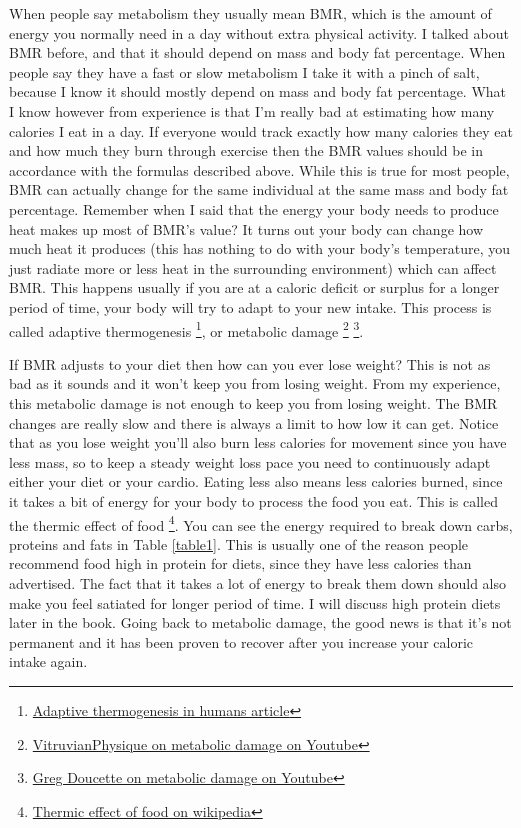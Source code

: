 \documentclass[openany, 12pt]{book}
\begin{document}
	When people say metabolism they usually mean BMR, which is the amount of energy you normally need in a day without extra physical activity. I talked about BMR before, and 
	that it should depend on mass and body fat percentage. When people say they have a fast or slow metabolism I take it with a pinch of salt, because I know it should mostly depend
        on mass and body fat percentage. What I know however from experience is that I'm really bad at estimating how many calories I eat in a day. If everyone would track exactly how
        many calories they eat and how much they burn through exercise then the BMR values should be in accordance with the formulas described above. While this is true for most people,
        BMR can actually change for the same individual at the same mass and body fat percentage. Remember when I said that the energy your body needs to produce heat makes up most of
        BMR's value? It turns out your body can change how much heat it produces (this has nothing to do with your body's temperature, you just radiate more or less heat in the surrounding
        environment) which can affect BMR. This happens usually if you are at a caloric deficit or surplus for a longer period of time, your body will try to adapt to your new intake. This
        process is called adaptive thermogenesis
        \footnote{\href{https://www.ncbi.nlm.nih.gov/pmc/articles/PMC3673773/}{Adaptive thermogenesis in humans article}}, or metabolic damage
        \footnote{\href{https://www.youtube.com/watch?v=bLboowVr2DM}{VitruvianPhysique on metabolic damage on Youtube}}
        \footnote{\href{https://www.youtube.com/watch?v=VVF64oQ3yZk}{Greg Doucette on metabolic damage on Youtube}}.

        If BMR adjusts to your diet then how can you ever lose weight? This is not as bad as it sounds and it won't keep you from losing weight. From my experience, this metabolic damage is
        not enough to keep you from losing weight. The BMR changes are really slow and there is always a limit to how low it can get. Notice that as you lose weight you'll also burn less
        calories for movement since you have less mass, so to keep a steady weight loss pace you need to continuously adapt either your diet or your cardio. Eating less also means less
        calories burned, since it takes a bit of energy for your body to process the food you eat. This is called the thermic effect of food
        \footnote{\href{https://en.wikipedia.org/wiki/Specific\_dynamic\_action}{Thermic effect of food on wikipedia}}. You can see the energy required to break down carbs, proteins and
        fats in Table \ref{table1}. This is usually one of the reason people recommend food high in protein for diets, since they have less calories than advertised. The fact that it takes a lot of
        energy to break them down should also make you feel satiated for longer period of time. I will discuss high protein diets later in the book. 
        Going back to metabolic damage, the good news is that it's not permanent
        and it has been proven to recover after you increase your caloric intake again.
\end{document}
